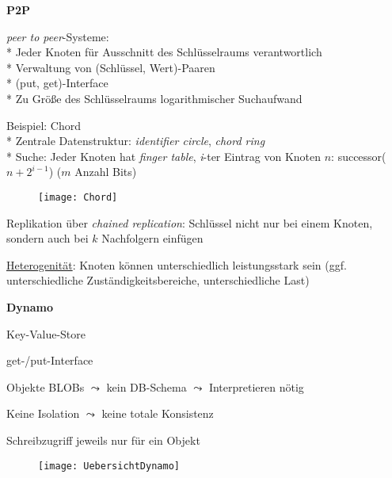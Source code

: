 \newpage

\textbf{P2P}
\begin{items}
	\item \emph{peer to peer}-Systeme:
		\\*
		Jeder Knoten für Ausschnitt des Schlüsselraums verantwortlich
		\\*
		Verwaltung von (Schlüssel, Wert)-Paaren
		\\*
		(put, get)-Interface
		\\*
		Zu Größe des Schlüsselraums logarithmischer Suchaufwand
	\item Beispiel: Chord
		\\*
		Zentrale Datenstruktur: \emph{identifier circle}, \emph{chord ring}
		\\* Suche: Jeder Knoten hat \emph{finger table}, \emph{i}-ter Eintrag von Knoten \( n \): successor(\( n+2^{i-1} \)) (\( m \) Anzahl Bits)
	\begin{figure}[H]\centering\label{Chord}\texttt{[image: Chord]}\end{figure}
	\item Replikation über \emph{chained replication}: Schlüssel nicht nur bei einem Knoten, sondern auch bei \( k \) Nachfolgern einfügen
	\item \underline{Heterogenität}: Knoten können unterschiedlich leistungsstark sein (ggf. unterschiedliche Zuständigkeitsbereiche, unterschiedliche Last)
\end{items}

\textbf{Dynamo}
\begin{items}
	\item Key-Value-Store
	\item get-/put-Interface
	\item Objekte BLOBs \( \leadsto \) kein DB-Schema \( \leadsto \) Interpretieren nötig
	\item Keine Isolation \( \leadsto \) keine totale Konsistenz
	\item Schreibzugriff jeweils nur für ein Objekt
\end{items}
\begin{figure}[H]\centering\label{UebersichtDynamo}\texttt{[image: UebersichtDynamo]}\end{figure}


